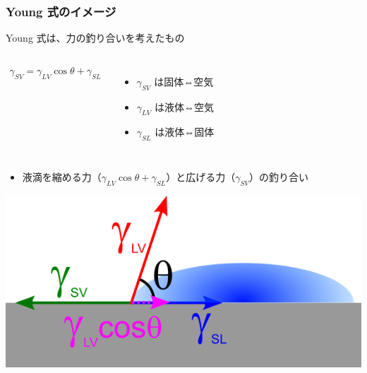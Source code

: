\documentclass[unicode,12pt]{beamer}%
\begin{document}
\begin{frame}
	\frametitle{Young 式のイメージ}
	\begin{block}{Young 式は、力の釣り合いを考えたもの}
		\begin{columns}[c, onlytextwidth]
			\begin{align*}
				\gamma_{SV} = \gamma_{LV} \cos \theta + \gamma_{SL}
			\end{align*}
			\begin{itemize}
				\item $\gamma_{SV}$ は固体⇔空気
				\item $\gamma_{LV}$ は液体⇔空気
				\item $\gamma_{SL}$ は液体⇔固体
			\end{itemize}
		\end{columns}
		
		\vspace{2mm}
		\begin{itemize}
			\item 液滴を縮める力（$\gamma_{LV} \cos \theta + \gamma_{SL}$）と広げる力（$\gamma_{SV}$）の釣り合い
		\end{itemize}

		\centering
			\includegraphics[width=.45\textwidth]{young.png}
	\end{block}
\end{frame}
\end{document}
